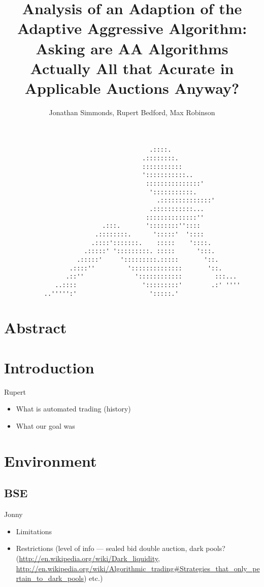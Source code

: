 \documentclass[12pt]{article} %
\title{Analysis of an Adaption of the Adaptive Aggressive Algorithm: Asking are AA Algorithms Actually All that Acurate in Applicable Auctions Anyway?}
\author{Jonathan Simmonds, Rupert Bedford, Max Robinson}
\date{} %
\begin{document}
\maketitle{}
\vspace{3cm}
\begin{verbatim}
                                        .::::. 
                                      .::::::::. 
                                      ::::::::::: 
                                      ':::::::::::.. 
                                       :::::::::::::::' 
                                        ':::::::::::. 
                                          .::::::::::::::' 
                                        .:::::::::::... 
                                       ::::::::::::::'' 
                           .:::.       '::::::::'':::: 
                         .::::::::.      ':::::'  ':::: 
                        .::::':::::::.    :::::    '::::. 
                      .:::::' ':::::::::. :::::      ':::. 
                    .:::::'     ':::::::::.:::::       '::. 
                  .::::''         '::::::::::::::       '::. 
                 .::''              '::::::::::::         :::... 
              ..::::                  ':::::::::'        .:' '''' 
           ..''''':'                    ':::::.' 
\end{verbatim}

\pagebreak

\section{Abstract}


\section{Introduction}
Rupert
\begin{itemize} \itemsep0pt
	\item What is automated trading (history)
	\item What our goal was
\end{itemize}


\section{Environment}
\subsection{BSE}
Jonny
\begin{itemize} \itemsep0pt
	\item Limitations
	\item Restrictions (level of info --- sealed bid double auction, dark pools? (\url{http://en.wikipedia.org/wiki/Dark_liquidity}, \url{http://en.wikipedia.org/wiki/Algorithmic_trading#Strategies_that_only_pertain_to_dark_pools}) etc.)
\end{itemize}
\end{document}
